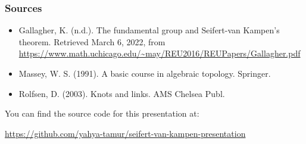 \documentclass[8pt]{beamer}
\begin{document}
  \begin{frame}
    \frametitle{Sources}
      \begin{itemize}
        \item Gallagher, K. (n.d.). The fundamental group and Seifert-van Kampen’s
          theorem. Retrieved March 6, 2022, from \url{https://www.math.uchicago.edu/~may/REU2016/REUPapers/Gallagher.pdf}
        \item Massey, W. S. (1991). A basic course in algebraic topology. Springer. 
        \item Rolfsen, D. (2003). Knots and links. AMS Chelsea Publ. 
      \end{itemize}

      You can find the source code for this presentation at:

      \url{https://github.com/yahya-tamur/seifert-van-kampen-presentation}
  \end{frame}
\end{document}

